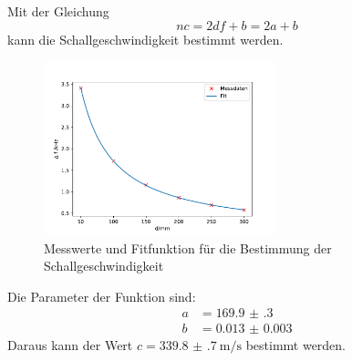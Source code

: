 Mit der Gleichung 
\begin{equation*}
    nc = 2df +b =2a+b
\end{equation*}
kann die Schallgeschwindigkeit bestimmt werden.
\FloatBarrier
\begin{figure}
    \includegraphics[width = 0.6\textwidth]{figure/Schallgeschwindigkeit.pdf}
    \caption{Messwerte und Fitfunktion für die Bestimmung der Schallgeschwindigkeit}
\end{figure}
\FloatBarrier
Die Parameter der Funktion sind:
\begin{align*}
    a&= \num{169.9(3)}\\
    b&= \num{0.013(3)}
\end{align*}
Daraus kann der Wert $c=\SI{339.8(7)}{\meter\per\second}$ bestimmt werden.

